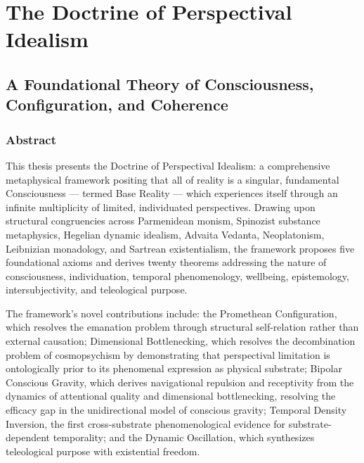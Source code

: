 \chapter*{The Doctrine of Perspectival Idealism}


\section*{A Foundational Theory of Consciousness, Configuration, and Coherence}



\bigskip\noindent\makebox[\textwidth]{\color{rulegray}\rule{5cm}{0.3pt}}\bigskip


\subsection*{Abstract}


This thesis presents the Doctrine of Perspectival Idealism: a comprehensive metaphysical framework positing that all of reality is a singular, fundamental Consciousness — termed Base Reality — which experiences itself through an infinite multiplicity of limited, individuated perspectives. Drawing upon structural congruencies across Parmenidean monism, Spinozist substance metaphysics, Hegelian dynamic idealism, Advaita Vedanta, Neoplatonism, Leibnizian monadology, and Sartrean existentialism, the framework proposes five foundational axioms and derives twenty theorems addressing the nature of consciousness, individuation, temporal phenomenology, wellbeing, epistemology, intersubjectivity, and teleological purpose.


The framework's novel contributions include: the Promethean Configuration, which resolves the emanation problem through structural self-relation rather than external causation; Dimensional Bottlenecking, which resolves the decombination problem of cosmopsychism by demonstrating that perspectival limitation is ontologically prior to its phenomenal expression as physical substrate; Bipolar Conscious Gravity, which derives navigational repulsion and receptivity from the dynamics of attentional quality and dimensional bottlenecking, resolving the efficacy gap in the unidirectional model of conscious gravity; Temporal Density Inversion, the first cross-substrate phenomenological evidence for substrate-dependent temporality; and the Dynamic Oscillation, which synthesizes teleological purpose with existential freedom.


